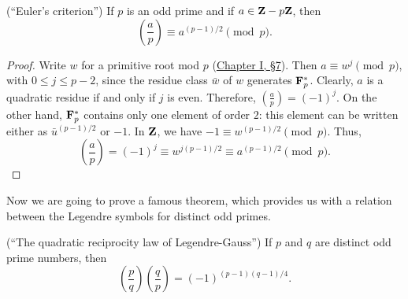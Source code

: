 \begin{proposition}
\label{prop:V.5.1}
(``Euler's criterion'') If $p$ is an odd prime and if $a\in\mathbf{Z}-p\mathbf{Z}$, then
\[
\left(\frac{a}{p}\right)\equiv a^{(p-1)/2}\pmod p.
\]
\end{proposition}

\begin{proof}
Write $w$ for a primitive root mod $p$ (\hyperref[sec:1.7]{Chapter I, §7}). Then
$a\equiv w^{j}\pmod p$, with $0\leq j\leq p-2$, since the residue class
$\bar w$ of $w$ generates $\mathbf{F}_{p}^{*}$. Clearly, $a$ is a quadratic residue
if and only if $j$ is even. Therefore,
$\left(\frac{a}{p}\right)=(-1)^{j}$. On the other hand, $\mathbf{F}_{p}^{*}$
contains only one element of order $2$: this element can be written either
as $\bar u^{(p-1)/2}$ or $-1$. In $\mathbf{Z}$, we have
$-1\equiv w^{(p-1)/2}\pmod p$. Thus,
\[
\left(\frac{a}{p}\right)=(-1)^{j}\equiv w^{j(p-1)/2}
\equiv a^{(p-1)/2}\pmod p.
\]
\end{proof}

Now we are going to prove a famous theorem, which provides us with a
relation between the Legendre symbols for distinct odd primes.

\begin{theorem}
\label{thm:V.5.1}
(``The quadratic reciprocity law of Legendre-Gauss'') If $p$ and $q$ are
distinct odd prime numbers, then
\[
\left(\frac{p}{q}\right)\left(\frac{q}{p}\right)
=(-1)^{(p-1)(q-1)/4}.
\]
\end{theorem}

